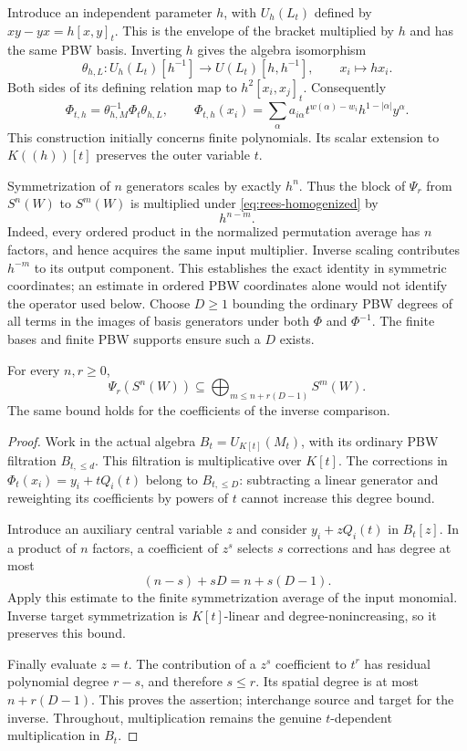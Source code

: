 Introduce an independent parameter $h$, with
$U_h(L_t)$ defined by
$xy-yx=h[x,y]_t$. This is the envelope of the bracket
multiplied by $h$ and has the same PBW basis. Inverting
$h$ gives the algebra isomorphism
\[
 \theta_{h,L}:U_h(L_t)[h^{-1}]
 \longrightarrow U(L_t)[h,h^{-1}],
 \qquad x_i\longmapsto h x_i.
\]
Both sides of its defining relation map to $h^2[x_i,x_j]_t$.
Consequently
\begin{equation}\label{eq:rees-homogenized}
 \Phi_{t,h}=\theta_{h,M}^{-1}\Phi_t\theta_{h,L},
 \qquad
 \Phi_{t,h}(x_i)=\sum_\alpha
 a_{i\alpha}t^{w(\alpha)-w_i}h^{1-|\alpha|}y^\alpha.
\end{equation}
This construction initially concerns finite polynomials. Its scalar
extension to $K((h))[t]$ preserves the outer variable $t$.

Symmetrization of $n$ generators scales by exactly $h^n$.
Thus the block of $\Psi_r$ from $S^n(W)$ to $S^m(W)$ is
multiplied under \eqref{eq:rees-homogenized} by
\begin{equation}\label{eq:rees-block}
 h^{n-m}.
\end{equation}
Indeed, every ordered product in the normalized permutation average
has $n$ factors, and hence acquires the same input multiplier.
Inverse scaling contributes $h^{-m}$ to its output component.
This establishes the exact identity in symmetric coordinates;
an estimate in ordered PBW coordinates alone would not identify
the operator used below.
Choose $D\geq1$ bounding the ordinary PBW degrees of all terms in
the images of basis generators under both $\Phi$ and $\Phi^{-1}$.
The finite bases and finite PBW supports ensure such a $D$ exists.

\begin{lemma}\label{lem:uniform-excess}
For every $n,r\geq0$,
\[
 \Psi_r(S^n(W))\subseteq\bigoplus_{m\leq n+r(D-1)}S^m(W).
\]
The same bound holds for the coefficients of the inverse comparison.
\end{lemma}

\begin{proof}
Work in the actual algebra $B_t=U_{K[t]}(M_t)$,
with its ordinary PBW filtration $B_{t,\leq d}$.
This filtration is multiplicative over $K[t]$.
The corrections in $\Phi_t(x_i)=y_i+tQ_i(t)$ belong to
$B_{t,\leq D}$: subtracting a linear generator and reweighting
its coefficients by powers of $t$ cannot increase this degree bound.

Introduce an auxiliary central variable $z$ and consider
$y_i+zQ_i(t)$ in $B_t[z]$. In a product of $n$ factors, a
coefficient of $z^s$ selects $s$ corrections and has degree at most
\[
 (n-s)+sD=n+s(D-1).
\]
Apply this estimate to the finite symmetrization average of the
input monomial. Inverse target symmetrization is $K[t]$-linear
and degree-nonincreasing, so it preserves this bound.

Finally evaluate $z=t$. The contribution of a $z^s$ coefficient
to $t^r$ has residual polynomial degree $r-s$, and therefore
$s\leq r$. Its spatial degree is at most $n+r(D-1)$.
This proves the assertion; interchange source and target for
the inverse. Throughout, multiplication remains the genuine
$t$-dependent multiplication in $B_t$.
\end{proof}

